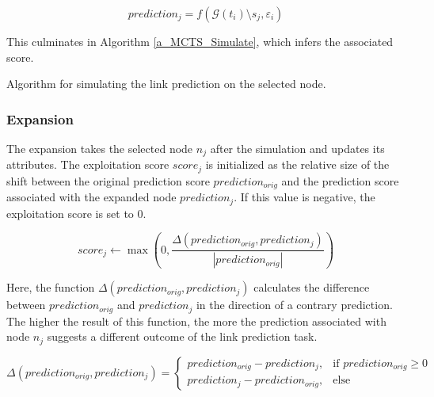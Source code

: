 \begin{equation}
    prediction_j = f(\mathcal{G}(t_i) \setminus s_j, \varepsilon_i)
\end{equation}

This culminates in Algorithm \ref{a_MCTS_Simulate}, which infers the associated score.

{
\setlength{\algomargin}{1.25em}
\small
\begin{algorithm}[ht]
\caption{Algorithm for simulating the link prediction on the selected node.}
\label{a_MCTS_Simulate}
\end{algorithm}
}

\subsubsection{Expansion}
\label{s_Methodology_Search_Expansion}

The expansion takes the selected node $n_j$ after the simulation and updates its attributes. The exploitation score $score_j$ is initialized as the relative size of the shift between the original prediction score $prediction_{orig}$ and the prediction score associated with the expanded node $prediction_j$. If this value is negative, the exploitation score is set to $0$. 

\begin{equation}
    \label{e_MCTS_score}
    score_j \gets \max\left(0, \frac{\Delta(prediction_{orig}, prediction_j)}{|prediction_{orig}|}\right)
\end{equation}

Here, the function $\Delta(prediction_{orig}, prediction_j)$ calculates the difference between $prediction_{orig}$ and $prediction_j$ in the direction of a contrary prediction. The higher the result of this function, the more the prediction associated with node $n_j$ suggests a different outcome of the link prediction task.

\begin{equation}
    \Delta(prediction_{orig}, prediction_j) = 
    \begin{cases}
        prediction_{orig} - prediction_j,  &\text{if } prediction_{orig} \geq 0 \\
        prediction_j - prediction_{orig},  &\text{else}
    \end{cases}
\end{equation}


